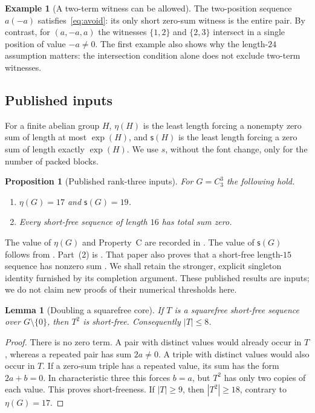 \documentclass[11pt]{article}
\newtheorem{proposition}[theorem]{Proposition}
\newtheorem{lemma}[theorem]{Lemma}
\theoremstyle{definition}
\newtheorem{example}[theorem]{Example}
\theoremstyle{remark}
\begin{document}
\begin{example}[A two-term witness can be allowed]\label{ex:pair}
The two-position sequence $a(-a)$ satisfies~\eqref{eq:avoid}: its only
short zero-sum witness is the entire pair. By contrast, for
$(a,-a,a)$ the witnesses $\{1,2\}$ and $\{2,3\}$ intersect in a
single position of value $-a\neq0$.
The first example also shows why the length-$24$ assumption matters:
the intersection condition alone does not exclude two-term witnesses.
\end{example}

\subsection{Published inputs}
For a finite abelian group $H$, $\eta(H)$ is the least length forcing a
nonempty zero sum of length at most $\exp(H)$, and $\mathsf{s}(H)$ is the
least length forcing a zero sum of length exactly $\exp(H)$.
We use $s$, without the font change, only for the number of packed blocks.

\begin{proposition}[Published rank-three inputs]\label{prop:inputs}
For $G=C_3^3$ the following hold.
\begin{enumerate}
\item $\eta(G)=17$ and $\mathsf{s}(G)=19$.
\item Every short-free sequence of length $16$ has total sum zero.
\end{enumerate}
\end{proposition}

The value of $\eta(G)$ and Property~C are recorded in
\cite[Lemma 7(3),(10)]{Fan2012}. The value of $\mathsf{s}(G)$ follows from
\cite[Lemma 2.6(4), the preceding Property D discussion, and Lemma 2.10]{Gao2024}.
Part~(2) is \cite[Lemma 28]{Fan2012}. That paper also proves that a
short-free length-$15$ sequence has nonzero sum
\cite[Lemma 29(1)]{Fan2012}. We shall retain the stronger, explicit singleton
identity furnished by its completion argument.
These published results are inputs; we do not claim new proofs of their
numerical thresholds here.

\begin{lemma}[Doubling a squarefree core]\label{lem:double}
If $T$ is a squarefree short-free sequence over $G\setminus\{0\}$,
then $T^2$ is short-free. Consequently $|T|\leq8$.
\end{lemma}
\begin{proof}
There is no zero term. A pair with distinct values would already occur in
$T$, whereas a repeated pair has sum $2a\neq0$.
A triple with distinct values would also occur in $T$.
If a zero-sum triple has a repeated value, its sum has the form $2a+b=0$.
In characteristic three this forces $b=a$, but $T^2$ has only two copies
of each value. This proves short-freeness. If $|T|\geq9$, then $|T^2|\geq18$,
contrary to $\eta(G)=17$.
\end{proof}
\end{document}
